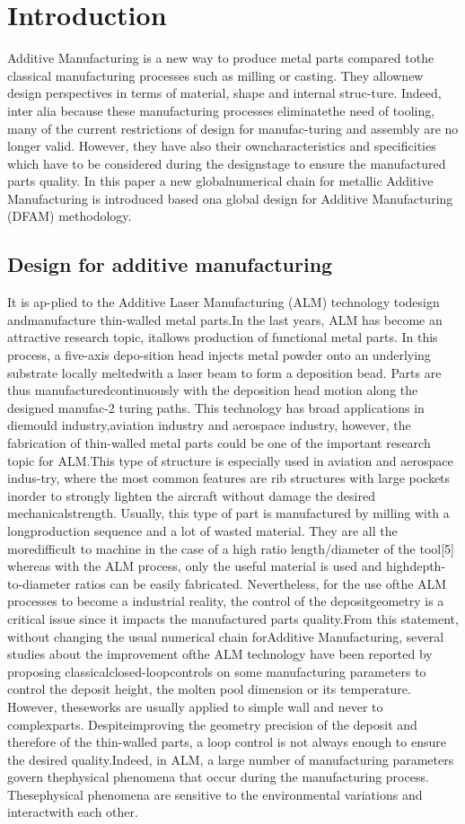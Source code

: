 \documentclass[conference]{IEEEtran}
\begin{document}
\section{Introduction}
Additive Manufacturing is a new way to produce metal parts compared tothe classical manufacturing processes such as milling or casting. They allownew design perspectives in terms of material, shape and internal struc-ture. Indeed, inter alia because these manufacturing processes eliminatethe need of tooling, many of the current restrictions of design for manufac-turing and assembly are no longer valid. However, they have also their owncharacteristics and specificities which have to be considered during the designstage to ensure the manufactured parts quality. In this paper a new globalnumerical chain for metallic Additive Manufacturing is introduced based ona global design for Additive Manufacturing (DFAM) methodology.
\subsection{Design for additive manufacturing}
It is ap-plied to the Additive Laser Manufacturing (ALM) technology todesign andmanufacture thin-walled metal parts.In the last years, ALM has become an attractive research topic, itallows production of functional metal parts. In this process, a five-axis depo-sition head injects metal powder onto an underlying substrate locally meltedwith a laser beam to form a deposition bead. Parts are thus manufacturedcontinuously with the deposition head motion along the designed manufac-2
turing paths. This technology has broad applications in diemould industry,aviation industry and aerospace industry, however, the fabrication of thin-walled metal parts could be one of the important research topic for ALM.This type of structure is especially used in aviation and aerospace indus-try, where the most common features are rib structures with large pockets inorder to strongly lighten the aircraft without damage the desired mechanicalstrength. Usually, this type of part is manufactured by milling with a longproduction sequence and a lot of wasted material. They are all the moredifficult to machine in the case of a high ratio length/diameter of the tool[5] whereas with the ALM process, only the useful material is used and highdepth-to-diameter ratios can be easily fabricated. Nevertheless, for the use ofthe ALM processes to become a industrial reality, the control of the depositgeometry is a critical issue since it impacts the manufactured parts quality.From this statement, without changing the usual numerical chain forAdditive Manufacturing, several studies about the improvement ofthe ALM technology have been reported by proposing classicalclosed-loopcontrols on some manufacturing parameters to control the deposit height, the molten pool dimension or its temperature. However, theseworks are usually applied to simple wall and never to complexparts. Despiteimproving the geometry precision of the deposit and therefore of the thin-walled parts, a loop control is not always enough to ensure the desired quality.Indeed, in ALM, a large number of manufacturing parameters govern thephysical phenomena that occur during the manufacturing process. Thesephysical phenomena are sensitive to the environmental variations and interactwith each other.  
\end{document}
